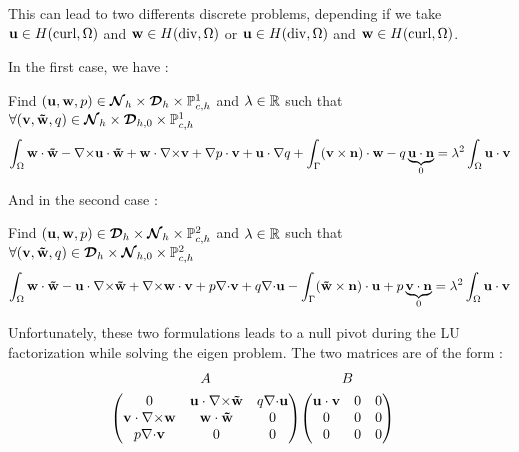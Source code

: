 This can lead to two differents discrete problems, depending if we take ${\mathbf{u}}\in H(\mathrm{curl},\Omega)$ and ${\mathbf{w}}\in H(\mathrm{div},\Omega)$ or ${\mathbf{u}}\in H(\mathrm{div},\Omega)$ and ${\mathbf{w}}\in H(\mathrm{curl},\Omega)$.

In the first case, we have :
\begin{pb}\label{pbmixedcurldiscrcurl}
Find $({\mathbf{u}},{\mathbf{w}},p)\in{\bm{\mathcal{N}}}_h\times{\bm{\mathcal{D}}}_h\times{\mathbb{P}}_{c,h}^1$ and $\lambda\in{\mathbb{R}}$ such that
$\forall ({\mathbf{v}},{\mathbf{\tilde{w}}},q) \in{\bm{\mathcal{N}}}_h\times{\bm{\mathcal{D}}}_{h,0}\times{\mathbb{P}}_{c,h}^1$
\[ \int_\Omega {\mathbf{w}}\cdot{\mathbf{\tilde{w}}} - {\nabla\times}{\mathbf{u}}\cdot{\mathbf{\tilde{w}}} + {\mathbf{w}}\cdot{\nabla\times}{\mathbf{v}} + {\nabla} p\cdot{\mathbf{v}} + {\mathbf{u}}\cdot{\nabla} q + \int_\Gamma ({\mathbf{v}}\times{\mathbf{n}})\cdot{\mathbf{w}} - q\underbrace{{\mathbf{u}}\cdot{\mathbf{n}}}_{0}
= \lambda^2\int_\Omega {\mathbf{u}}\cdot{\mathbf{v}} \]
\end{pb}

And in the second case :
\begin{pb}\label{pbmixedcurldiscrdiv}
Find $({\mathbf{u}},{\mathbf{w}},p)\in{\bm{\mathcal{D}}}_h\times{\bm{\mathcal{N}}}_h\times{\mathbb{P}}_{c,h}^2$ and $\lambda\in{\mathbb{R}}$ such that
$\forall ({\mathbf{v}},{\mathbf{\tilde{w}}},q) \in{\bm{\mathcal{D}}}_h\times{\bm{\mathcal{N}}}_{h,0}\times{\mathbb{P}}_{c,h}^2$
\[ \int_\Omega {\mathbf{w}}\cdot{\mathbf{\tilde{w}}} - {\mathbf{u}}\cdot{\nabla\times}{\mathbf{\tilde{w}}} + {\nabla\times}{\mathbf{w}}\cdot{\mathbf{v}} + p{\nabla\cdot}{\mathbf{v}} + q{\nabla\cdot}{\mathbf{u}} - \int_\Gamma ({\mathbf{\tilde{w}}}\times{\mathbf{n}})\cdot{\mathbf{u}} + p\underbrace{{\mathbf{v}}\cdot{\mathbf{n}}}_{0}
= \lambda^2\int_\Omega {\mathbf{u}}\cdot{\mathbf{v}} \]
\end{pb}

Unfortunately, these two formulations leads to a null pivot during the LU
factorization while solving the eigen problem. The two matrices are of the form
:
\begin{align*}
\begin{gathered}
A \\
\begin{pmatrix}
0 & {\mathbf{u}}\cdot{\nabla\times}{\mathbf{\tilde{w}}} & q{\nabla\cdot}{\mathbf{u}} \\
{\mathbf{v}}\cdot{\nabla\times}{\mathbf{w}} & {\mathbf{w}}\cdot{\mathbf{\tilde{w}}} & 0 \\
p{\nabla\cdot}{\mathbf{v}} & 0 & 0
\end{pmatrix}
\end{gathered}
&
\begin{gathered}
B \\
\begin{pmatrix}
{\mathbf{u}}\cdot{\mathbf{v}} & 0 & 0 \\
0 & 0 & 0 \\
0 & 0 & 0
\end{pmatrix}
\end{gathered}
\end{align*}



